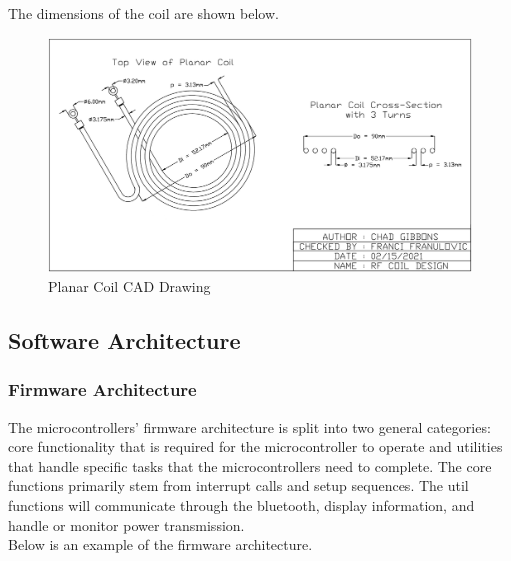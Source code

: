 \documentclass[12pt]{article}
\begin{document}
\indent
The dimensions of the coil are shown below.
\hfill

\begin{figure}[h!]
\centering
\includegraphics[width=0.95\linewidth]{Coil_CAD}
\caption{Planar Coil CAD Drawing}
\end{figure}

\hfill

\pagebreak

\subsection{Software Architecture}
\subsubsection{Firmware Architecture} The microcontrollers’ firmware architecture is split into two general categories: core functionality that is required for the microcontroller to operate and utilities that handle specific tasks that the microcontrollers need to complete.  The core functions primarily stem from interrupt calls and setup sequences.  The util functions will communicate through the bluetooth, display information, and handle or monitor power transmission.\\

\indent
Below is an example of the firmware architecture.
\hfill
\end{document}
